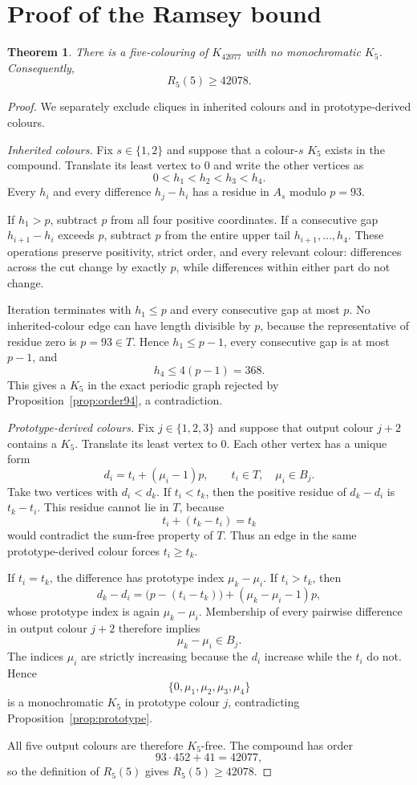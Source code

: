 \documentclass[11pt]{article}
\newtheorem{theorem}{Theorem}[section]
\theoremstyle{definition}
\theoremstyle{remark}
\begin{document}
\section{Proof of the Ramsey bound}
\label{sec:proof}

\begin{theorem}
\label{thm:main}
There is a five-colouring of $K_{42077}$ with no monochromatic $K_5$.
Consequently,
\[
  R_5(5)\ge42078.
\]
\end{theorem}

\begin{proof}
We separately exclude cliques in inherited colours and in
prototype-derived colours.

\emph{Inherited colours.}
Fix $s\in\{1,2\}$ and suppose that a colour-$s$ $K_5$ exists in the
compound.  Translate its least vertex to $0$ and write the other vertices
as
\[
  0<h_1<h_2<h_3<h_4.
\]
Every $h_i$ and every difference $h_j-h_i$ has a residue in $A_s$ modulo
$p=93$.

If $h_1>p$, subtract $p$ from all four positive coordinates.  If a
consecutive gap $h_{i+1}-h_i$ exceeds $p$, subtract $p$ from the entire
upper tail $h_{i+1},\ldots,h_4$.  These operations preserve positivity,
strict order, and every relevant colour: differences across the cut change
by exactly $p$, while differences within either part do not change.

Iteration terminates with $h_1\le p$ and every consecutive gap at most
$p$.  No inherited-colour edge can have length divisible by $p$, because
the representative of residue zero is $p=93\in T$.  Hence
$h_1\le p-1$, every consecutive gap is at most $p-1$, and
\[
  h_4\le4(p-1)=368.
\]
This gives a $K_5$ in the exact periodic graph rejected by
Proposition~\ref{prop:order94}, a contradiction.

\emph{Prototype-derived colours.}
Fix $j\in\{1,2,3\}$ and suppose that output colour $j+2$ contains a
$K_5$.  Translate its least vertex to $0$.  Each other vertex has a unique
form
\[
  d_i=t_i+(\mu_i-1)p,
  \qquad t_i\in T,\quad \mu_i\in B_j.
\]
Take two vertices with $d_i<d_k$.  If $t_i<t_k$, then the positive residue
of $d_k-d_i$ is $t_k-t_i$.  This residue cannot lie in $T$, because
\[
  t_i+(t_k-t_i)=t_k
\]
would contradict the sum-free property of $T$.  Thus an edge in the same
prototype-derived colour forces $t_i\ge t_k$.

If $t_i=t_k$, the difference has prototype index $\mu_k-\mu_i$.  If
$t_i>t_k$, then
\[
  d_k-d_i=
  \bigl(p-(t_i-t_k)\bigr)+(\mu_k-\mu_i-1)p,
\]
whose prototype index is again $\mu_k-\mu_i$.  Membership of every
pairwise difference in output colour $j+2$ therefore implies
\[
  \mu_k-\mu_i\in B_j.
\]
The indices $\mu_i$ are strictly increasing because the $d_i$ increase
while the $t_i$ do not.  Hence
\[
  \{0,\mu_1,\mu_2,\mu_3,\mu_4\}
\]
is a monochromatic $K_5$ in prototype colour $j$, contradicting
Proposition~\ref{prop:prototype}.

All five output colours are therefore $K_5$-free.  The compound has order
\[
  93\cdot452+41=42077,
\]
so the definition of $R_5(5)$ gives $R_5(5)\ge42078$.
\end{proof}
\end{document}

